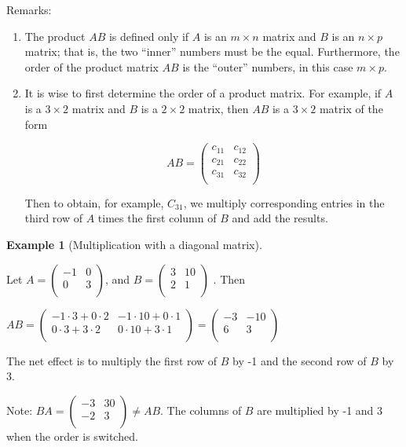 \documentclass[10pt,]{book}
\theoremstyle{plain}
\theoremstyle{definition}
\theoremstyle{definition}
\theoremstyle{definition}
\newtheorem{example}[theorem]{Example}
\theoremstyle{definition}
\begin{document}
\par
Remarks:%
\par
\leavevmode%
\begin{enumerate}[label=\arabic*]
\item\hypertarget{li-3}{} The product \(A B\) is defined only if \(A\) is an \(m\times n\) matrix and \(B\) is an \(n\times p\) matrix; that is, the two ``inner'' numbers must be the equal. Furthermore, the order of the product matrix \(A B\) is the ``outer'' numbers, in
this case \(m\times p\).
%
\item\hypertarget{li-4}{}It is wise to first determine the order of a product matrix. For example, if \(A\) is a \(3\times 2\) matrix and \(B\) is a \(2\times 2\) matrix, then \(A B\) is a \(3\times 2\) matrix of the form

\[A B =\left(
\begin{array}{cc}
 c_{11} & c_{12} \\
 c_{21} & c_{22} \\
 c_{31} & c_{32} \\
\end{array}
\right)\] 

Then to obtain, for example, \(C_{31}\), we multiply corresponding entries in the third row of \(A\) times the first column of \(B\)
and add the results.%
\end{enumerate}
%
\begin{example}[Multiplication with a diagonal matrix]\label{ex-diagonal-product}


Let \(A =\left(
\begin{array}{cc}
 -1 & 0 \\
 0 & 3 \\
\end{array}
\right)\), and \(B =\left(
\begin{array}{cc}
 3 & 10 \\
 2 & 1 \\
\end{array}
\right)\) . Then

\(A B =\left(
\begin{array}{cc}
 -1\cdot 3 + 0\cdot 2 & -1\cdot 10+0\cdot 1 \\
 0\cdot 3+3\cdot 2 & 0\cdot 10+3\cdot 1 \\
\end{array}
\right)= \left(
\begin{array}{cc}
 -3 & -10 \\
 6 & 3 \\
\end{array}
\right)\)
%
\par
The net effect is to multiply the first row of \(B\) by -1 and the second row of \(B\) by 3.%
\par
Note: \(B A =\left(
\begin{array}{cc}
 -3 & 30 \\
 -	2 & 3 \\
\end{array}
\right) \neq A B\).   The columns of \(B\) are multiplied by -1 and 3 when the order is switched.
%
\end{example}
\end{document}
